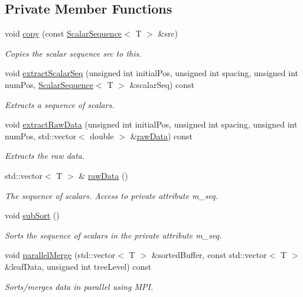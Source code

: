 \subsection*{Private Member Functions}
\begin{DoxyCompactItemize}
\item 
void \hyperlink{class_q_u_e_s_o_1_1_scalar_sequence_a2c160c4e19bb6007e5def4615695741d}{copy} (const \hyperlink{class_q_u_e_s_o_1_1_scalar_sequence}{Scalar\-Sequence}$<$ T $>$ \&src)
\begin{DoxyCompactList}\small\item\em Copies the scalar sequence {\ttfamily src} to {\ttfamily this}. \end{DoxyCompactList}\item 
void \hyperlink{class_q_u_e_s_o_1_1_scalar_sequence_a194418ec240f5d7f5614e203157181ae}{extract\-Scalar\-Seq} (unsigned int initial\-Pos, unsigned int spacing, unsigned int num\-Pos, \hyperlink{class_q_u_e_s_o_1_1_scalar_sequence}{Scalar\-Sequence}$<$ T $>$ \&scalar\-Seq) const 
\begin{DoxyCompactList}\small\item\em Extracts a sequence of scalars. \end{DoxyCompactList}\item 
void \hyperlink{class_q_u_e_s_o_1_1_scalar_sequence_a998c8f01c49c06076f2ce97a51d4ab2c}{extract\-Raw\-Data} (unsigned int initial\-Pos, unsigned int spacing, unsigned int num\-Pos, std\-::vector$<$ double $>$ \&\hyperlink{class_q_u_e_s_o_1_1_scalar_sequence_a4bb2d2b4fddee3fe0fdefd9be068eaea}{raw\-Data}) const 
\begin{DoxyCompactList}\small\item\em Extracts the raw data. \end{DoxyCompactList}\item 
std\-::vector$<$ T $>$ \& \hyperlink{class_q_u_e_s_o_1_1_scalar_sequence_a4bb2d2b4fddee3fe0fdefd9be068eaea}{raw\-Data} ()
\begin{DoxyCompactList}\small\item\em The sequence of scalars. Access to private attribute {\ttfamily m\-\_\-seq}. \end{DoxyCompactList}\item 
void \hyperlink{class_q_u_e_s_o_1_1_scalar_sequence_ae0cf4dcb27543caefc38e921968cdb6c}{sub\-Sort} ()
\begin{DoxyCompactList}\small\item\em Sorts the sequence of scalars in the private attribute {\ttfamily m\-\_\-seq}. \end{DoxyCompactList}\item 
void \hyperlink{class_q_u_e_s_o_1_1_scalar_sequence_aedb57153660cf539fc0ca3737a1c4f7b}{parallel\-Merge} (std\-::vector$<$ T $>$ \&sorted\-Buffer, const std\-::vector$<$ T $>$ \&leaf\-Data, unsigned int tree\-Level) const 
\begin{DoxyCompactList}\small\item\em Sorts/merges data in parallel using M\-P\-I. \end{DoxyCompactList}\end{DoxyCompactItemize}
